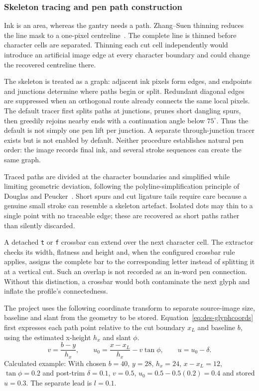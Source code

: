 \subsubsection{Skeleton tracing and pen path construction}
Ink is an area, whereas the gantry needs a path. Zhang--Suen thinning reduces the line mask to a one-pixel centreline~\cite[p.~237]{zhang1984}. The complete line is thinned before character cells are separated. Thinning each cut cell independently would introduce an artificial image edge at every character boundary and could change the recovered centreline there.

The skeleton is treated as a graph: adjacent ink pixels form edges, and endpoints and junctions determine where paths begin or split. Redundant diagonal edges are suppressed when an orthogonal route already connects the same local pixels. The default tracer first splits paths at junctions, prunes short dangling spurs, then greedily rejoins nearby ends with a continuation angle below $75^\circ$. Thus the default is not simply one pen lift per junction. A separate through-junction tracer exists but is not enabled by default. Neither procedure establishes natural pen order: the image records final ink, and several stroke sequences can create the same graph.

Traced paths are divided at the character boundaries and simplified while limiting geometric deviation, following the polyline-simplification principle of Douglas and Peucker~\cite[page to verify]{douglas1973}. Short spurs and cut ligature tails require care because a genuine small stroke can resemble a skeleton artefact. Isolated dots may thin to a single point with no traceable edge; these are recovered as short paths rather than silently discarded.

A detached \texttt{t} or \texttt{f} crossbar can extend over the next character cell. The extractor checks its width, flatness and height and, when the configured crossbar rule applies, assigns the complete bar to the corresponding letter instead of splitting it at a vertical cut. Such an overlap is not recorded as an in-word pen connection. Without this distinction, a crossbar would both contaminate the next glyph and inflate the profile's connectedness.

The project uses the following coordinate transform to separate source-image size, baseline and slant from the geometry to be stored. Equation~\ref{eq:des-glyphcoords} first expresses each path point relative to the cut boundary $x_L$ and baseline $b$, using the estimated x-height $h_x$ and slant $\phi$.
\begin{equation}
v=\frac{b-y}{h_x},\qquad
u_0=\frac{x-x_L}{h_x}-v\tan\phi,\qquad u=u_0-\delta.
\label{eq:des-glyphcoords}
\end{equation}
Calculated example: With chosen $b=40$, $y=28$, $h_x=24$, $x-x_L=12$, $\tan\phi=0.2$ and post-trim $\delta=0.1$, $v=0.5$, $u_0=0.5-0.5(0.2)=0.4$ and stored $u=0.3$. The separate lead is $l=0.1$.

